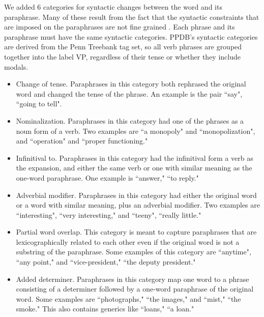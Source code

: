 \documentclass[11pt]{article}
\begin{document}
We added 6 categories for syntactic changes between the word and its paraphrase.  Many of these result from the fact that the syntactic constraints that are imposed on the paraphrases are not fine grained \cite{ccb:2008:EMNLP}.  Each phrase and its paraphrase must have the same syntactic categories.  PPDB's syntactic categories are derived from the Penn Treebank tag set, so all verb phrases are grouped together into the label VP, regardless of their tense or whether they include modals. 
\begin{itemize}
\item Change of tense. Paraphrases in this category both rephrased the original word and changed the tense of the phrase. An example is the pair ``say", ``going to tell". 

\item Nominalization. Paraphrases in this category had one of the phrases as a noun form of a verb. Two examples are ``a monopoly" and ``monopolization", and ``operation" and  ``proper functioning." 

\item Infinitival to. Paraphrases in this category had the infinitival form a verb as the expansion, and either the same verb or one with similar meaning as the one-word paraphrase. One example is ``answer," ``to reply."

\item Adverbial modifier. Paraphrases in this category had either the original word or a word with similar meaning, plus an adverbial modifier. Two examples are ``interesting", ``very interesting," and ``teeny", ``really little."

\item Partial word overlap. 
This category is meant to capture paraphrases that are lexicographically related to each other even if the original word is not a substring of the paraphrase. Some examples of this category are ``anytime", ``any point," and ``vice-president," ``the deputy president."

\item Added determiner. Paraphrases in this category map one word to a phrase consisting of a determiner followed by a one-word paraphrase of the original word. Some examples are ``photographs," ``the images," and ``mist," ``the smoke."  This also contains generics like ``loans," ``a loan."
%
\end{itemize}
\end{document}

